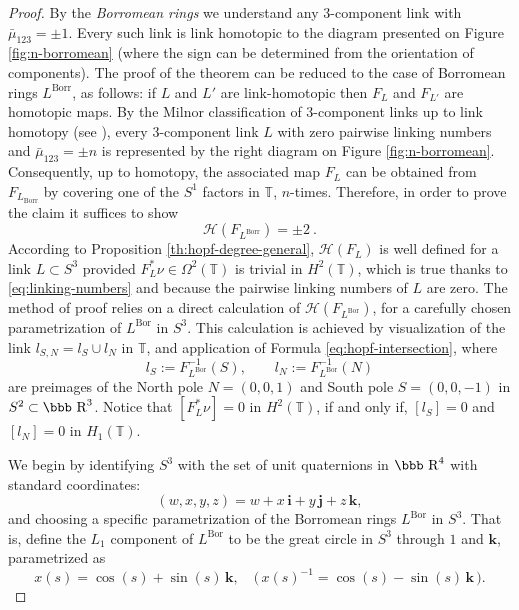 \documentclass[12pt]{article}
\numberwithin{equation}{section}
\newcommand{\R}{\mbox{\bbb R}}       %
\begin{document}
\begin{proof}

 By the \emph{Borromean rings} we understand any $3$-component link with $\bar{\mu}_{123}=\pm 1$. Every such link is link homotopic to the diagram presented on Figure \ref{fig:n-borromean} (where the sign can be determined from the orientation of components). The proof of the theorem can be reduced to the case of Borromean rings $L^\text{Borr}$, as follows:  if $L$ and $L'$ are link-homotopic then $F_{L}$ and $F_{L'}$ are homotopic maps.
 By the Milnor classification of 3-component links up to link homotopy (see \cite{Milnor54}), every 3-component link $L$ with zero pairwise linking numbers and $\bar{\mu}_{123}=\pm n$ is represented by the right diagram on Figure \ref{fig:n-borromean}. Consequently, up to homotopy, the associated map $F_L$ can be obtained from $F_{L_\text{Borr}}$ by covering one of the $S^1$ factors in $\mathbb{T}$, $n$-times. 
Therefore, in order to prove the claim it suffices to show 
\begin{equation}\label{eq:hopf=2}
 \mathscr{H}(F_{L^\text{Borr}})=\pm 2\ .
\end{equation}
 According to Proposition \ref{th:hopf-degree-general}, $\mathscr{H}(F_L)$ is well defined for a link $L\subset S^3$ provided  $F_L^\ast\nu\in \Omega^2(\mathbb{T})$ is trivial in $H^2(\mathbb{T})$, which is true thanks to \eqref{eq:linking-numbers} and because the pairwise linking numbers of $L$ are zero. The method of proof relies on a direct calculation of 
$\mathscr{H}(F_{L^\text{Bor}})$, for a carefully chosen parametrization of $L^\text{Bor}$ in $S^3$. This calculation is achieved by 
visualization of the link $l_{S,N}=l_S\cup l_N$ in $\mathbb{T}$, and application of Formula \eqref{eq:hopf-intersection}, where
\[
 l_S:=F^{-1}_{L^\text{Bor}}(S),\qquad l_N:=F^{-1}_{L^\text{Bor}}(N)
\]
are preimages of the North pole $N=(0,0,1)$ and South pole $S=(0,0,-1)$ in $S^2\subset \R^3$. Notice that $[F_L^\ast\nu]=0$ in $H^2(\mathbb{T})$, if and only if, $[l_S]=0$ and $[l_N]=0$ in $H_1(\mathbb{T})$.



 We begin by identifying $S^3$ with the set of unit quaternions in $\R^4$ with standard
coordinates: 
\[
 (w,x,y,z)=w+x\,\mathbf{i}+y\,\mathbf{j}+z\,\mathbf{k},
\]
and choosing a specific parametrization of the
Borromean rings $L^\text{Bor}$ in $S^3$. That is, define the $L_1$ component of
 $L^\text{Bor}$ to be the great circle  in $S^3$ through $1$ and $\mathbf{k}$, parametrized as
\[
x(s)=\cos(s)+\sin(s)\,\mathbf{k},\quad
\bigl(\,x(s)^{-1}=\cos(s)-\sin(s)\,\mathbf{k}\,\bigr).
\]


\end{proof}
\end{document}
